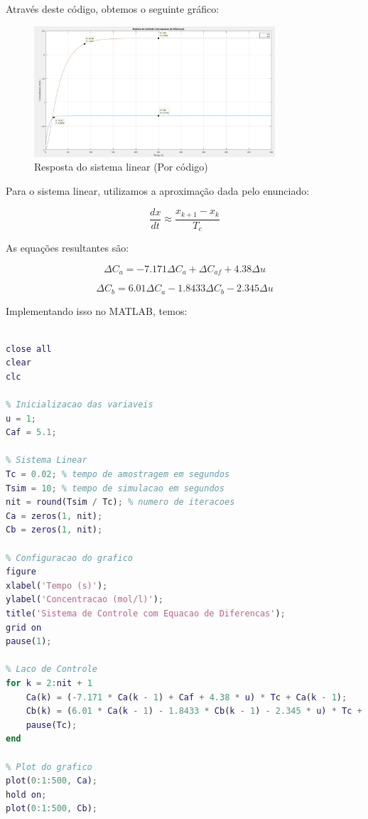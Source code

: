 \documentclass[a4paper,12pt]{report}
\begin{document}
Através deste código, obtemos o seguinte gráfico:

\begin{figure}[h]
\centering
\includegraphics[width=0.8\textwidth]{figura12.png}
\caption{Resposta do sistema linear (Por código)}
\end{figure}

Para o sistema linear, utilizamos a aproximação dada pelo enunciado:

\[
\frac{dx}{dt} \approx \frac{x_{k+1} - x_k}{T_c}
\]

As equações resultantes são:

\[
\Delta C_a = -7.171 \Delta C_a + \Delta C_{af} + 4.38 \Delta u
\]

\[
\Delta C_b = 6.01 \Delta C_a - 1.8433 \Delta C_b - 2.345 \Delta u
\]

Implementando isso no MATLAB, temos:
\begin{lstlisting}[language=Matlab, caption={Exemplo de codigo MATLAB}, label={lst:matlab}]

close all
clear
clc

% Inicializacao das variaveis
u = 1;
Caf = 5.1;

% Sistema Linear
Tc = 0.02; % tempo de amostragem em segundos
Tsim = 10; % tempo de simulacao em segundos
nit = round(Tsim / Tc); % numero de iteracoes
Ca = zeros(1, nit);
Cb = zeros(1, nit);

% Configuracao do grafico
figure
xlabel('Tempo (s)');
ylabel('Concentracao (mol/l)');
title('Sistema de Controle com Equacao de Diferencas');
grid on
pause(1);

% Laco de Controle
for k = 2:nit + 1
    Ca(k) = (-7.171 * Ca(k - 1) + Caf + 4.38 * u) * Tc + Ca(k - 1);
    Cb(k) = (6.01 * Ca(k - 1) - 1.8433 * Cb(k - 1) - 2.345 * u) * Tc + Cb(k - 1);
    pause(Tc);
end

% Plot do grafico
plot(0:1:500, Ca);
hold on;
plot(0:1:500, Cb);

\end{lstlisting}
\end{document}
